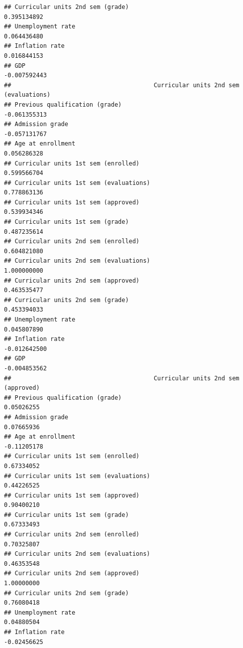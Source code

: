 \documentclass[
]{article}
\begin{document}
\begin{verbatim}
## Curricular units 2nd sem (grade)                               0.395134892
## Unemployment rate                                              0.064436480
## Inflation rate                                                 0.016844153
## GDP                                                           -0.007592443
##                                        Curricular units 2nd sem (evaluations)
## Previous qualification (grade)                                   -0.061355313
## Admission grade                                                  -0.057131767
## Age at enrollment                                                 0.056286328
## Curricular units 1st sem (enrolled)                               0.599566704
## Curricular units 1st sem (evaluations)                            0.778863136
## Curricular units 1st sem (approved)                               0.539934346
## Curricular units 1st sem (grade)                                  0.487235614
## Curricular units 2nd sem (enrolled)                               0.604821080
## Curricular units 2nd sem (evaluations)                            1.000000000
## Curricular units 2nd sem (approved)                               0.463535477
## Curricular units 2nd sem (grade)                                  0.453394033
## Unemployment rate                                                 0.045807890
## Inflation rate                                                   -0.012642500
## GDP                                                              -0.004853562
##                                        Curricular units 2nd sem (approved)
## Previous qualification (grade)                                  0.05026255
## Admission grade                                                 0.07665936
## Age at enrollment                                              -0.11205178
## Curricular units 1st sem (enrolled)                             0.67334052
## Curricular units 1st sem (evaluations)                          0.44226525
## Curricular units 1st sem (approved)                             0.90400210
## Curricular units 1st sem (grade)                                0.67333493
## Curricular units 2nd sem (enrolled)                             0.70325807
## Curricular units 2nd sem (evaluations)                          0.46353548
## Curricular units 2nd sem (approved)                             1.00000000
## Curricular units 2nd sem (grade)                                0.76080418
## Unemployment rate                                               0.04880504
## Inflation rate                                                 -0.02456625

\end{verbatim}
\end{document}
